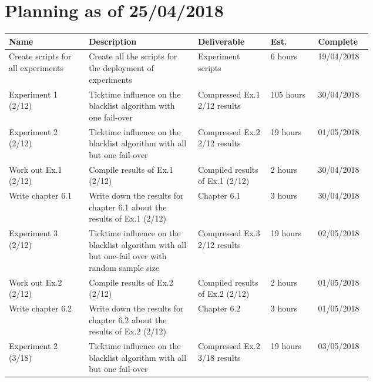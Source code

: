 
%

\section{Planning as of 25/04/2018}
\begin{longtable}{| p{0.22\linewidth} | p{0.3\linewidth}| p{0.2\linewidth} | l | l |}
\hline
\textbf{Name} & \textbf{Description} & \textbf{Deliverable} & \textbf{Est.} & \textbf{Complete} \\ \hline

Create scripts for all experiments & Create all the scripts for the deployment of experiments & Experiment scripts & 6 hours & 19/04/2018 \\
\hline

Experiment 1 (2/12) & Ticktime influence on the blacklist algorithm with one fail-over & Compressed Ex.1 2/12 results & 105 hours & 30/04/2018 \\ 
\hline

Experiment 2 (2/12) & Ticktime influence on the blacklist algorithm with all but one fail-over & Compressed Ex.2 2/12 results & 19 hours & 01/05/2018 \\
\hline

Work out Ex.1 (2/12) & Compile results of Ex.1 (2/12) & Compiled results of Ex.1 (2/12) & 2 hours & 30/04/2018 \\
\hline  

Write chapter 6.1 & Write down the results for chapter 6.1 about the results of Ex.1 (2/12) & Chapter 6.1 & 3 hours & 30/04/2018 \\
\hline

Experiment 3 (2/12) & Ticktime influence on the blacklist algorithm with all but one-fail over with random sample size & Compressed Ex.3 2/12 results & 19 hours & 02/05/2018 \\
\hline

Work out Ex.2 (2/12) & Compile results of Ex.2 (2/12) & Compiled results of Ex.2 (2/12) & 2 hours & 01/05/2018 \\
\hline 

Write chapter 6.2 & Write down the results for chapter 6.2 about the results of Ex.2 (2/12) & Chapter 6.2 & 3 hours & 01/05/2018 \\
\hline

Experiment 2 (3/18) & Ticktime influence on the blacklist algorithm with all but one fail-over & Compressed Ex.2 3/18 results & 19 hours & 03/05/2018 \\
\hline


\end{longtable}
